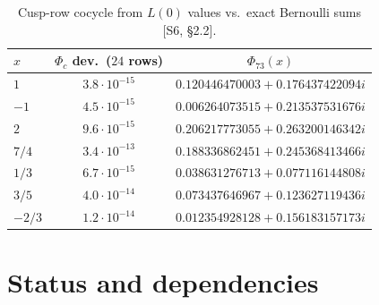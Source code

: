 \documentclass[11pt]{article}
\theoremstyle{definition}
\newcommand{\src}[1]{\textup{[S#1]}}
\begin{document}
\begin{table}[ht]\centering\small
\begin{tabular}{lcc}\toprule
$x$ & $\Phi_c$ dev.\ ($24$ rows) & $\Phi_{73}(x)$\\\midrule
$1$ & $3.8\cdot10^{-15}$ & $0.120446470003+0.176437422094i$\\
$-1$ & $4.5\cdot10^{-15}$ & $0.006264073515+0.213537531676i$\\
$2$ & $9.6\cdot10^{-15}$ & $0.206217773055+0.263200146342i$\\
$7/4$ & $3.4\cdot10^{-13}$ & $0.188336862451+0.245368413466i$\\
$1/3$ & $6.7\cdot10^{-15}$ & $0.038631276713+0.077116144808i$\\
$3/5$ & $4.0\cdot10^{-14}$ & $0.073437646967+0.123627119436i$\\
$-2/3$ & $1.2\cdot10^{-14}$ & $0.012354928128+0.156183157173i$\\\bottomrule
\end{tabular}
\caption{Cusp-row cocycle from $L(0)$ values vs.\ exact Bernoulli sums \src{6, \S2.2}.}\label{tab:phi73}
\end{table}

\section{Status and dependencies}\label{sec:status}
\end{document}
